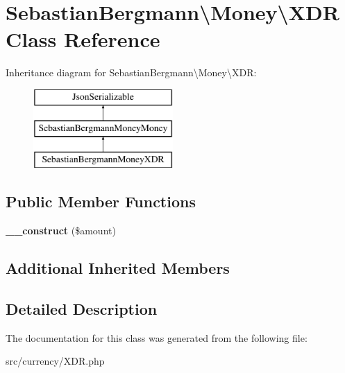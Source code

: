 \hypertarget{classSebastianBergmann_1_1Money_1_1XDR}{}\section{Sebastian\+Bergmann\textbackslash{}Money\textbackslash{}X\+D\+R Class Reference}
\label{classSebastianBergmann_1_1Money_1_1XDR}
Inheritance diagram for Sebastian\+Bergmann\textbackslash{}Money\textbackslash{}X\+D\+R\+:\begin{figure}[H]
\begin{center}
\leavevmode
\includegraphics[height=3.000000cm]{classSebastianBergmann_1_1Money_1_1XDR}
\end{center}
\end{figure}
\subsection*{Public Member Functions}
\begin{DoxyCompactItemize}
\item 
\hypertarget{classSebastianBergmann_1_1Money_1_1XDR_aedd6d889adca82f71cd3282e01269fae}{}{\bfseries \+\_\+\+\_\+construct} (\$amount)\label{classSebastianBergmann_1_1Money_1_1XDR_aedd6d889adca82f71cd3282e01269fae}

\end{DoxyCompactItemize}
\subsection*{Additional Inherited Members}


\subsection{Detailed Description}


The documentation for this class was generated from the following file\+:\begin{DoxyCompactItemize}
\item 
src/currency/X\+D\+R.\+php\end{DoxyCompactItemize}
